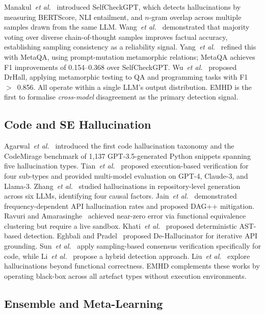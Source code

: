 \documentclass[runningheads]{llncs}
\newcommand{\method}{\textsc{EMHD}}
\newcommand{\etal}{\textit{et al.}}
\begin{document}
Manakul~\etal~\cite{manakul2023selfcheckgpt} introduced SelfCheckGPT, which detects hallucinations by measuring BERTScore, NLI entailment, and $n$-gram overlap across multiple samples drawn from the same LLM. Wang~\etal~\cite{wang2023selfconsistency} demonstrated that majority voting over diverse chain-of-thought samples improves factual accuracy, establishing sampling consistency as a reliability signal. Yang~\etal~\cite{yang2025metaqa} refined this with MetaQA, using prompt-mutation metamorphic relations; MetaQA achieves F1 improvements of 0.154--0.368 over SelfCheckGPT. Wu~\etal~\cite{wu2025drhall} proposed DrHall, applying metamorphic testing to QA and programming tasks with F1~$>$~0.856. All operate within a single LLM's output distribution. \method{} is the first to formalise \emph{cross-model} disagreement as the primary detection signal.

\subsection{Code and SE Hallucination}

Agarwal~\etal~\cite{agarwal2025codemirage} introduced the first code hallucination taxonomy and the CodeMirage benchmark of 1,137 GPT-3.5-generated Python snippets spanning five hallucination types. Tian~\etal~\cite{tian2025codehalu} proposed execution-based verification for four sub-types and provided multi-model evaluation on GPT-4, Claude-3, and Llama-3. Zhang~\etal~\cite{zhang2025llmhallucinations} studied hallucinations in repository-level generation across six LLMs, identifying four causal factors. Jain~\etal~\cite{jain2025codeapi} demonstrated frequency-dependent API hallucination rates and proposed DAG++ mitigation. Ravuri and Amarasinghe~\cite{ravuri2025clustering} achieved near-zero error via functional equivalence clustering but require a live sandbox. Khati~\etal~\cite{khati2026ast} proposed deterministic AST-based detection. Eghbali and Pradel~\cite{eghbali2024dehallucinator} proposed De-Hallucinator for iterative API grounding. Sun~\etal~\cite{sun2025sampling} apply sampling-based consensus verification specifically for code, while Li~\etal~\cite{li2025hybrid} propose a hybrid detection approach. Liu~\etal~\cite{liu2025beyond} explore hallucinations beyond functional correctness. \method{} complements these works by operating black-box across all artefact types without execution environments.

\subsection{Ensemble and Meta-Learning}
\end{document}
